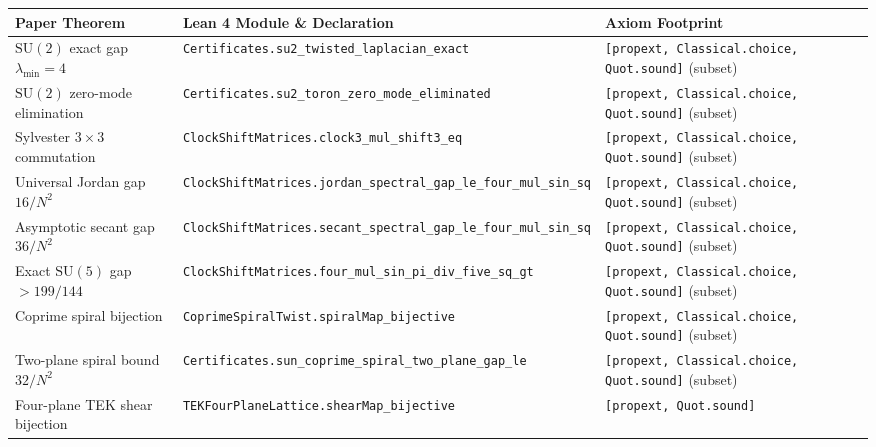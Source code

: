 \documentclass[11pt,a4paper]{article}
\newcommand{\SU}{\mathrm{SU}}
\begin{document}
\begin{table}[ht]
\centering
\scriptsize
\begin{tabular}{@{}p{4.3cm}p{6.6cm}p{3.4cm}@{}}
\toprule
Paper Theorem & Lean 4 Module \& Declaration & Axiom Footprint \\
\midrule
$\SU(2)$ exact gap $\lambda_{\min} = 4$ & \texttt{Certificates.}\newline\texttt{su2\_twisted\_laplacian\_exact} & \texttt{[propext, Classical.choice,} \texttt{Quot.sound]} (subset) \\
$\SU(2)$ zero-mode elimination & \texttt{Certificates.}\newline\texttt{su2\_toron\_zero\_mode\_eliminated} & \texttt{[propext, Classical.choice,} \texttt{Quot.sound]} (subset) \\
Sylvester $3 \times 3$ commutation & \texttt{ClockShiftMatrices.}\newline\texttt{clock3\_mul\_shift3\_eq} & \texttt{[propext, Classical.choice,} \texttt{Quot.sound]} (subset) \\
Universal Jordan gap $16/N^2$ & \texttt{ClockShiftMatrices.}\newline\texttt{jordan\_spectral\_gap\_le\_four\_mul\_sin\_sq} & \texttt{[propext, Classical.choice,} \texttt{Quot.sound]} (subset) \\
Asymptotic secant gap $36/N^2$ & \texttt{ClockShiftMatrices.}\newline\texttt{secant\_spectral\_gap\_le\_four\_mul\_sin\_sq} & \texttt{[propext, Classical.choice,} \texttt{Quot.sound]} (subset) \\
Exact $\SU(5)$ gap $> 199/144$ & \texttt{ClockShiftMatrices.}\newline\texttt{four\_mul\_sin\_pi\_div\_five\_sq\_gt} & \texttt{[propext, Classical.choice,} \texttt{Quot.sound]} (subset) \\
Coprime spiral bijection & \texttt{CoprimeSpiralTwist.}\newline\texttt{spiralMap\_bijective} & \texttt{[propext, Classical.choice,} \texttt{Quot.sound]} (subset) \\
Two-plane spiral bound $32/N^2$ & \texttt{Certificates.}\newline\texttt{sun\_coprime\_spiral\_two\_plane\_gap\_le} & \texttt{[propext, Classical.choice,} \texttt{Quot.sound]} (subset) \\
Four-plane TEK shear bijection & \texttt{TEKFourPlaneLattice.}\newline\texttt{shearMap\_bijective} & \texttt{[propext, Quot.sound]} \\

\end{tabular}
\end{table}
\end{document}
